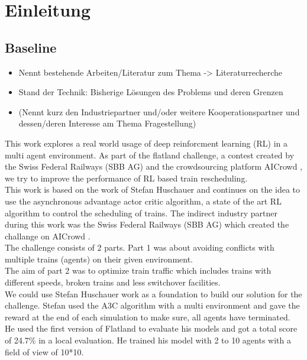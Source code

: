\chapter{Einleitung}\label{chap.einleitung}
\section{Baseline}\label{baseline}

\begin{itemize}
\item Nennt bestehende Arbeiten/Literatur zum Thema -> Literaturrecherche
\item Stand der Technik: Bisherige Lösungen des Problems und deren Grenzen
\item (Nennt kurz den Industriepartner und/oder weitere Kooperationspartner und dessen/deren Interesse am Thema Fragestellung)
\end{itemize}
This work explores a real world usage of deep reinforcment learning (RL) in a multi agent environment. As part of the flatland challenge, a contest created by the Swiss Federal Railways (SBB AG) and the crowdsourcing platform AICrowd \cite{aicrowd}, we try to improve the performance of RL based train rescheduling.\\
This work is based on the work of Stefan Huschauer \cite{flatlandstephan} and continues on the idea to use the asynchronous advantage actor critic algorithm, a state of the art RL algorithm to control the scheduling of trains.
The indirect industry partner during this work was the Swiss Federal Railways (SBB AG) which created the challange on AICrowd .\\
The challenge consists of 2 parts. Part 1 was about avoiding conflicts with multiple trains (agents) on their given environment. \\
The aim of part 2 was to optimize train traffic which includes trains with different speeds, broken trains and less switchover facilities.\\
We could use Stefan Huschauer\cite{flatlandstephan} work as a foundation to build our solution for the challenge.
Stefan used the A3C algorithm with a multi environment and gave the reward at the end of  each simulation to make sure, all agents have terminated.\\
He used the first version of Flatland to evaluate his models and got a total score of 24.7\% in a local evaluation.%
He trained his model with 2 to 10 agents with a field of view of 10*10. %


